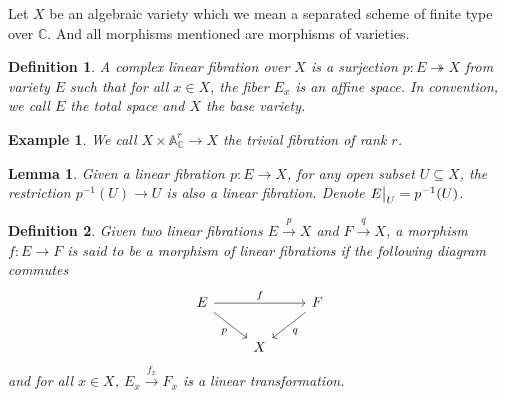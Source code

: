 \documentclass{ctexart}
\newtheorem{definition}{Definition}[section]
\newtheorem{lemma}{Lemma}[section]
\newtheorem{example}{Example}[section]
\begin{document}
Let $X$ be an algebraic variety which we mean a separated scheme of finite type over $\mathbb{C}$.
And all morphisms mentioned are morphisms of varieties.
\begin{definition}
    A complex linear fibration over $X$ is a surjection $p: E \twoheadrightarrow X$ from variety $E$ such that for all $x\in X$, 
    the fiber $E_{x}$ is an affine space.
    In convention, we call $E$ the total space and $X$ the base variety.
\end{definition}
\begin{example}
    We call $X \times \mathbb{A}_{\mathbb{C}}^{r} \rightarrow X$ the trivial fibration of rank $r$.
\end{example}
\begin{lemma}
    Given a linear fibration $p: E \rightarrow X$, for any open subset $U \subseteq X$,
    the restriction $p^{-1}(U) \rightarrow U$ is also a linear fibration.
    Denote $E\big{|}_{U} = p^{-1}(U)$.
    \label{Lemma 1.4}
\end{lemma}
\begin{definition}
    Given two linear fibrations $E \overset{p}{\rightarrow} X$ and $F \overset{q}{\rightarrow} X$,
    a morphism $f: E \rightarrow F$ is said to be a morphism of linear fibrations if the following diagram commutes
    \begin{equation}
        \begin{tikzcd}
            E \arrow[rr, "f"] \arrow[dr, "p" swap] &&
            F \arrow[dl, "q"] \\
            & X &
        \end{tikzcd}
    \end{equation}
    and for all $x\in X$, $E_{x} \overset{f_{x}}{\rightarrow} F_{x}$ is a linear transformation.
\end{definition}
\end{document}
